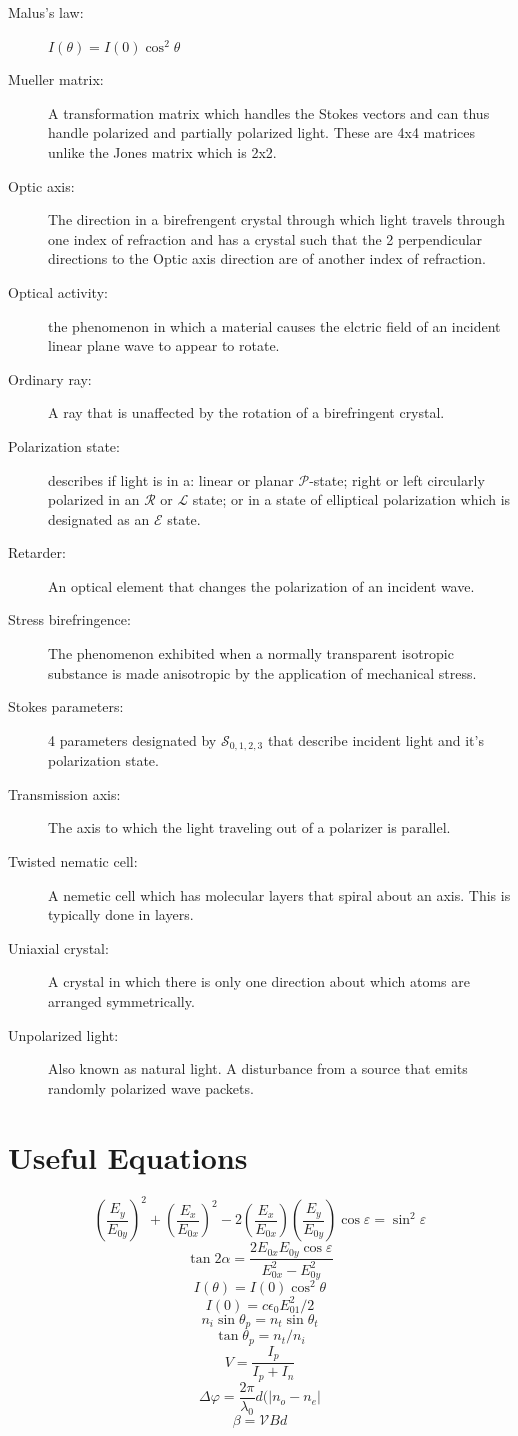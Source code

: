 \documentclass[12pt]{report}
\begin{document}
\begin{description}
\item[Malus's law: ] $I(\theta)=I(0)\cos^2\theta$
\item[Mueller matrix: ] A transformation matrix which handles the Stokes vectors and can thus handle polarized and partially polarized light. These are 4x4 matrices unlike the Jones matrix which is 2x2. 
\item[Optic axis: ] The direction in a birefrengent crystal through which light travels through one index of refraction and has a crystal such that the 2 perpendicular directions to the Optic axis direction are of another index of refraction. 
\item[Optical activity: ] the phenomenon in which a material causes the elctric field of an incident linear plane wave to appear to rotate.
\item[Ordinary ray: ] A ray that is unaffected by the rotation of a birefringent crystal.
\item[Polarization state: ] describes if light is in a: linear or planar $\mathcal{P}$-state; right or left circularly polarized in an $\mathcal{R}$ or $\mathcal{L}$ state; or in a state of elliptical polarization which is designated as an $\mathcal{E}$ state. 
\item[Retarder: ] An optical element that changes the polarization of an incident wave.
\item[Stress birefringence: ] The phenomenon exhibited when a normally transparent isotropic substance is made anisotropic by the application of mechanical stress.
\item[Stokes parameters: ] 4 parameters designated by $\mathcal{S}_{0,1,2,3}$ that describe incident light and it's polarization state. 
\item[Transmission axis: ] The axis to which the light traveling out of a polarizer is parallel. 
\item[Twisted nematic cell: ] A nemetic cell which has molecular layers that spiral about an axis. This is typically done in layers. 
\item[Uniaxial crystal: ] A crystal in which there is only one direction about which atoms are arranged symmetrically. 
\item[Unpolarized light: ] Also known as natural light. A disturbance from a source that emits randomly polarized wave packets. 

\end{description}

\section{Useful Equations}
\[\left( \frac{E_y}{E_{0y}} \right) ^2 + \left( \frac{E_x}{E_{0x}} \right) ^2 -2 \left( \frac{E_x}{E_{0x}} \right) \left( \frac{E_y}{E_{0y}} \right) \cos \varepsilon = \sin ^2 \varepsilon\]
\[\tan 2\alpha = \frac{2E_{0x}E_{0y}\cos \varepsilon}{E_{0x}^2 - E_{0y}^2}\]
\[I(\theta)=I(0)\cos^2\theta\]
\[I(0) = c\epsilon_0E_{01}^2/2\]
\[n_i \sin \theta_p = n_t \sin \theta_t\]
\[\tan \theta_p = n_t/n_i\]
\[V = \frac{I_p}{I_p+I_n}\]
\[\Delta\varphi=\frac{2\pi}{\lambda_0}d(|n_o-n_e|\]
\[\beta = \mathcal{V}Bd\]
\end{document}
